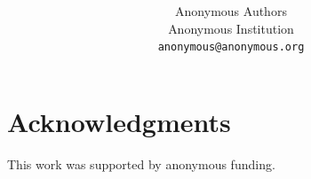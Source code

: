 \documentclass[11pt]{article}
\title{\textbf{}}
\author{
  Anonymous Authors \\
  Anonymous Institution \\
  \texttt{anonymous@anonymous.org}
}
\begin{document}
\maketitle

\begin{abstract}

\end{abstract}








\section*{Acknowledgments}
This work was supported by anonymous funding.




\appendix


\end{document}

